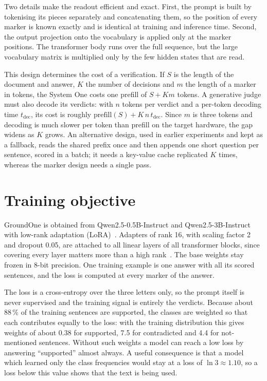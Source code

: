 Two details make the readout efficient and exact. First, the prompt is built by tokenising its pieces separately and
concatenating them, so the position of every marker is known exactly and is identical at training and inference time.
Second, the output projection onto the vocabulary is applied only at the marker positions. The transformer body runs
over the full sequence, but the large vocabulary matrix is multiplied only by the few hidden states that are read.

This design determines the cost of a verification. If $S$ is the length of the document and answer, $K$ the number of
decisions and $m$ the length of a marker in tokens, the System One costs one prefill of $S + K m$ tokens. A generative
judge must also decode its verdicts: with $n$ tokens per verdict and a per-token decoding time $t_\mathrm{dec}$, its
cost is roughly $\mathrm{prefill}(S) + K\, n\, t_\mathrm{dec}$. Since $m$ is three tokens and decoding is much slower
per token than prefill on the target hardware, the gap widens as $K$ grows. An alternative design, used in earlier
experiments and kept as a fallback, reads the shared prefix once and then appends one short question per sentence,
scored in a batch; it needs a key-value cache replicated $K$ times, whereas the marker design needs a single pass.


\section{Training objective}
\label{sec:method-training}

GroundOne is obtained from Qwen2.5-0.5B-Instruct and Qwen2.5-3B-Instruct~\cite{qwen2024qwen25} with low-rank
adaptation (LoRA)~\cite{hu2022lora}. Adapters of rank 16, with scaling factor 2 and dropout 0.05, are attached to all
linear layers of all transformer blocks, since covering every layer matters more than a high rank~\cite{dettmers2023qlora}.
The base weights stay frozen in 8-bit precision. One training example is one answer with all its scored sentences, and
the loss is computed at every marker of the answer.

The loss is a cross-entropy over the three letters only, so the prompt itself is never supervised and the training
signal is entirely the verdicts. Because about 88\,\% of the training sentences are supported, the classes are
weighted so that each contributes equally to the loss: with the training distribution this gives weights of about 0.38
for supported, 7.5 for contradicted and 4.4 for not-mentioned sentences. Without such weights a model can reach a low
loss by answering ``supported'' almost always. A useful consequence is that a model which learned only the class
frequencies would stay at a loss of $\ln 3 \approx 1.10$, so a loss below this value shows that the text is being used.


